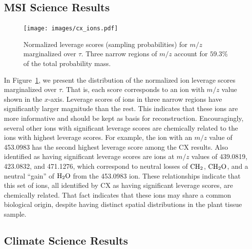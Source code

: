   

  \subsection{MSI Science Results}
  
  \begin{figure}[h!bt]
    \centering
    \texttt{[image: images/cx\_ions.pdf]}
      \caption{Normalized leverage scores (sampling probabilities) for $m/z$ marginalized over $\tau$.
        Three narrow regions of $m/z$ account for $59.3\%$ of the total probability mass.}
      \label{fig:cx_ions}
  \end{figure} 

  In Figure~\ref{fig:cx_ions}, we present the distribution of the normalized
  ion leverage scores marginalized over $\tau$. That is, each score corresponds
  to an ion with $m/z$ value shown in the $x$-axis. Leverage scores of ions in
  three narrow regions have significantly larger magnitude than the rest. This
  indicates that these ions are more informative and should be kept as basis
  for reconstruction.  Encouragingly, several other ions with significant
  leverage scores are chemically related to the ions with highest leverage
  scores.  For example, the ion with an $m/z$ value of 453.0983 has the second
  highest leverage score among the CX results.  Also identified as having
  significant leverage scores are ions at $m/z$ values of 439.0819, 423.0832,
  and 471.1276, which correspond to neutral losses of $\rm{CH_2}$,
  $\rm{CH_2O}$, and a neutral ``gain'' of $\rm{H_2O}$ from the 453.0983 ion.
  These relationships indicate that this set of ions, all identified by CX as
  having significant leverage scores, are chemically related.  That fact
  indicates that these ions may share a common biological origin, despite
  having distinct spatial distributions in the plant tissue sample.
  

  \subsection{Climate Science Results}

